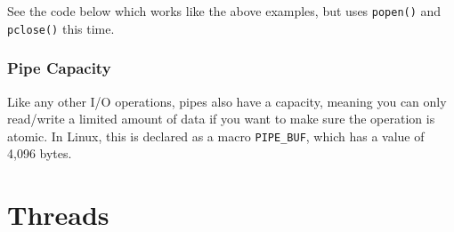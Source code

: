 \documentclass{article}
\newcommand{\code}[1]{\texttt{#1}}
\begin{document}
\noindent See the code below which works like the above examples, but uses \code{popen()} and \code{pclose()} this time.



\subsubsection{Pipe Capacity}

Like any other I/O operations, pipes also have a capacity, meaning you can only read/write a limited amount of data if you want to make sure the operation is atomic. In Linux, this is declared as a macro \code{PIPE\_BUF}, which has a value of 4,096 bytes. 

\newpage
\section{Threads}
\end{document}
